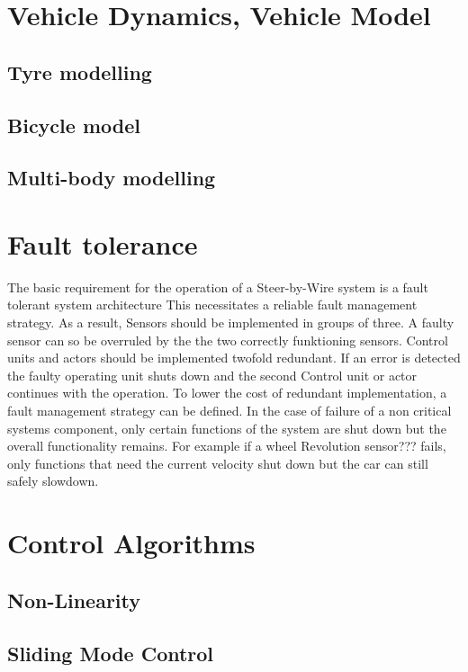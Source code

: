 \documentclass[conference]{IEEEtran}
\begin{document}
\section{Vehicle Dynamics, Vehicle Model}
\subsection{Tyre modelling}
\subsection{Bicycle model}
\subsection{Multi-body modelling}

\section{Fault tolerance}
The basic requirement for the operation of a Steer-by-Wire system is a fault tolerant system architecture %
This necessitates a reliable fault management strategy.
As a result, Sensors should be implemented in groups of three. A faulty sensor can so be overruled by the the two correctly funktioning sensors. Control units and actors should be implemented twofold redundant. If an error is detected the faulty operating unit shuts down and the second Control unit or actor continues with the operation. To lower the cost of redundant implementation, a fault management strategy can be defined. In the case of failure of a non critical systems component, only certain functions of the system are shut down but the overall functionality remains. For example if a wheel Revolution sensor??? fails, only functions that need the current velocity shut down but the car can still safely slowdown.

\section{Control Algorithms}
\subsection{Non-Linearity}
\subsection{Sliding Mode Control}
\end{document}
